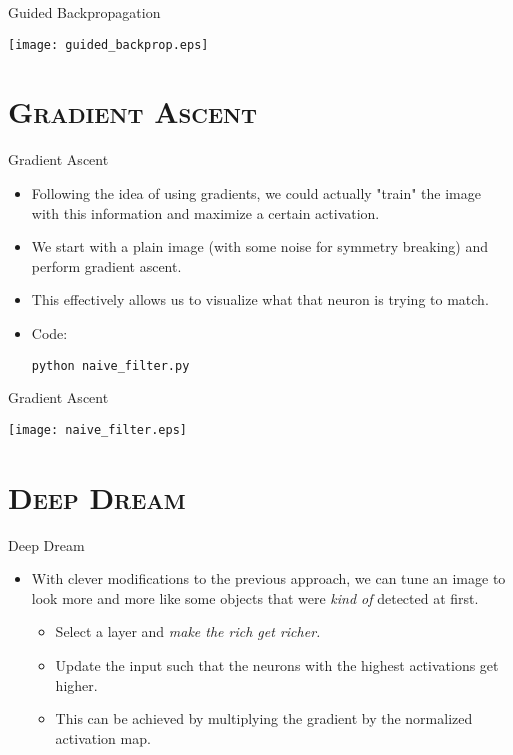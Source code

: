 \begin{frame}{Guided Backpropagation}
	\begin{center}
		\texttt{[image: guided\_backprop.eps]}
	\end{center}
\end{frame}

\section{\scshape Gradient Ascent}
\begin{frame}{Gradient Ascent}
	\begin{itemize}
		\item Following the idea of using gradients, we could actually "train" the image with this information and maximize a certain activation.
		\item We start with a plain image (with some noise for symmetry breaking) and perform gradient ascent.
		\item This effectively allows us to visualize what that neuron is trying to match.
		\item<2-> Code:
		\begin{center}
			{\smaller \texttt{python naive\_filter.py}}
		\end{center}
	\end{itemize}
\end{frame}

\begin{frame}{Gradient Ascent}
	\begin{center}
		\texttt{[image: naive\_filter.eps]}
	\end{center}
\end{frame}

\section{\scshape Deep Dream}
\begin{frame}{Deep Dream}
	\begin{itemize}
		\item With clever modifications to the previous approach, we can tune an image to
		look more and more like some objects that were \textit{kind of} detected at first.
		\begin{itemize}
			\item Select a layer and \textit{make the rich get richer.}
			\item Update the input such that the neurons with the highest activations get higher.
			\item This can be achieved by multiplying the gradient by the normalized activation map.
		\end{itemize}
	\end{itemize}
\end{frame}

